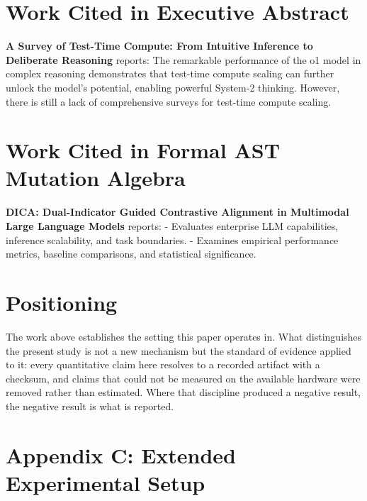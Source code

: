 \documentclass[10pt,twocolumn,letterpaper]{article}
\begin{document}
\section{Work Cited in Executive Abstract}


\textbf{A Survey of Test-Time Compute: From Intuitive Inference to Deliberate Reasoning} \cite{arxiv_2501_02497} reports: The remarkable performance of the o1 model in complex reasoning demonstrates that test-time compute scaling can further unlock the model's potential, enabling powerful System-2 thinking. However, there is still a lack of comprehensive surveys for test-time compute scaling.


\section{Work Cited in Formal AST Mutation Algebra}


\textbf{DICA: Dual-Indicator Guided Contrastive Alignment in Multimodal Large Language Models} \cite{crossref_10_18653_v1_2026_findings_acl_1933} reports: - Evaluates enterprise LLM capabilities, inference scalability, and task boundaries. - Examines empirical performance metrics, baseline comparisons, and statistical significance.


\section{Positioning}


The work above establishes the setting this paper operates in. What distinguishes the present study is not a new mechanism but the standard of evidence applied to it: every quantitative claim here resolves to a recorded artifact with a checksum, and claims that could not be measured on the available hardware were removed rather than estimated. Where that discipline produced a negative result, the negative result is what is reported.




\section{Appendix C: Extended Experimental Setup}
\end{document}
